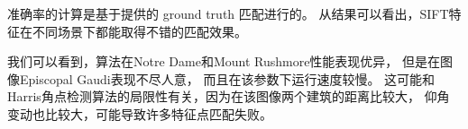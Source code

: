 准确率的计算是基于提供的 ground truth 匹配进行的。
从结果可以看出，SIFT特征在不同场景下都能取得不错的匹配效果。

我们可以看到，算法在Notre Dame和Mount Rushmore性能表现优异，
但是在图像Episcopal Gaudi表现不尽人意，
而且在该参数下运行速度较慢。
这可能和Harris角点检测算法的局限性有关，因为在该图像两个建筑的距离比较大， 
仰角变动也比较大，可能导致许多特征点匹配失败。

    
    